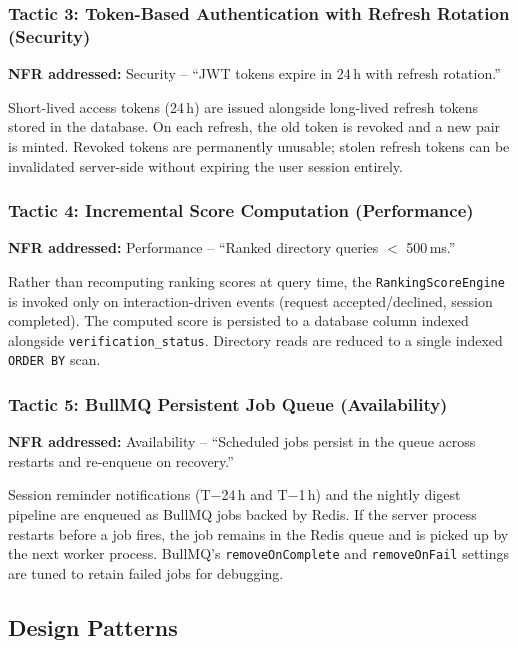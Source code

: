 \documentclass[12pt,a4paper]{article}
\begin{document}
\subsubsection{Tactic 3: Token-Based Authentication with Refresh Rotation (Security)}

\textbf{NFR addressed:} Security -- ``JWT tokens expire in 24\,h with refresh rotation.''

Short-lived access tokens (24\,h) are issued alongside long-lived refresh tokens stored in the database. On each refresh, the old token is revoked and a new pair is minted. Revoked tokens are permanently unusable; stolen refresh tokens can be invalidated server-side without expiring the user session entirely.

\subsubsection{Tactic 4: Incremental Score Computation (Performance)}

\textbf{NFR addressed:} Performance -- ``Ranked directory queries $<$ 500\,ms.''

Rather than recomputing ranking scores at query time, the \texttt{RankingScoreEngine} is invoked only on interaction-driven events (request accepted/declined, session completed). The computed score is persisted to a database column indexed alongside \texttt{verification\_status}. Directory reads are reduced to a single indexed \texttt{ORDER BY} scan.

\subsubsection{Tactic 5: BullMQ Persistent Job Queue (Availability)}

\textbf{NFR addressed:} Availability -- ``Scheduled jobs persist in the queue across restarts and re-enqueue on recovery.''

Session reminder notifications (T$-$24\,h and T$-$1\,h) and the nightly digest pipeline are enqueued as BullMQ jobs backed by Redis. If the server process restarts before a job fires, the job remains in the Redis queue and is picked up by the next worker process. BullMQ's \texttt{removeOnComplete} and \texttt{removeOnFail} settings are tuned to retain failed jobs for debugging.

\subsection{Design Patterns}
\end{document}
